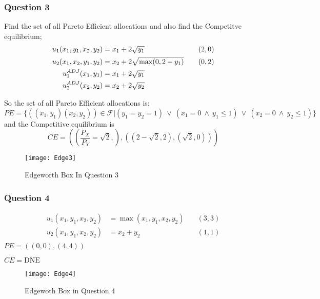 \documentclass[12pt,a4paper]{article}
\begin{document}
\subsubsection*{Question 3}
Find the set of all Pareto Efficient allocations and also find the Competitve equilibrium;
\begin{align*}
    u_{1}(x_{1},y_{1},x_{2},y_{2})&= x_{1}+ 2\sqrt{y_{1}} \quad &(2,0) \\
    u_{2}(x_{1},x_{2},y_{1},y_{2})&= x_{2} + 2\sqrt{\max(0,2-y_{1})} \quad &(0,2)\\
    \vspace{5pt}
    u_{1}^{ADJ}(x_{1},y_{1})&= x_{1}+2\sqrt{y_{1}} \\
    u_{2}^{ADJ}(x_{2},y_{2})&= x_{2}+2\sqrt{y_{2}} \\
\end{align*}

So the set of all Pareto Efficient allocations is;
\begin{equation*}
    PE=\{\left( (x_{1},y_{1})(x_{2},y_{2}) \right) \in \mathcal{F} | (y_{1}=y_{2}=1) \ \vee \ (x_{1}=0 \ \wedge \ y_{1}\leq 1) \ \vee \ (x_{2}=0 \ \wedge \ y_{2}\leq 1)\}
\end{equation*}
and the Competitive equilibrium is 
\begin{equation*}
    CE=\left( \left( \frac{P_{X}}{P_{Y}}=\sqrt{2}, \right),\left( (2-\sqrt{2}, 2),(\sqrt{2},0) \right) \right)  
\end{equation*}   

\begin{center}
    \begin{figure}[h]
        \centering
        \texttt{[image: Edge3]}
        \caption{Edgeworth Box In Question 3}
        \label{Label}
    \end{figure}
    
\end{center}

\subsubsection*{Question 4}

\begin{align*}
    u_{1}(x_{1},y_{1},x_{2},y_{2})&=\max(x_{1},y_{1},x_{2},y_{2}) \quad &(3,3)\\
    u_{2}(x_{1},y_{1},x_{2},y_{2})&= x_{2}+y_{2} \quad &(1,1)\\
\end{align*}
 \(PE=\left( (0,0),(4,4) \right) \) 
 
 \(CE=\text{DNE} \)  
 \begin{center}
    \begin{figure}[ht!]
        \centering
        \texttt{[image: Edge4]}
        \caption{Edgewoth Box in Question 4}
        \label{Label}
    \end{figure}
    
 \end{center}
\end{document}
